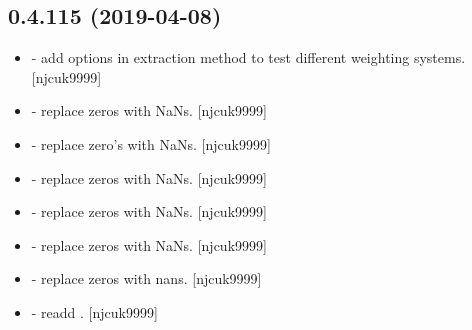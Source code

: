 \documentclass[a4paper,10pt,english]{report}
\begin{document}
\subsection{0.4.115 (2019-04-08)}
\label{\detokenize{misc/changelog:id145}}\begin{itemize}
\item {} 
 - add options in extraction method to test different
weighting systems. {[}njcuk9999{]}

\item {} 
 - replace zeros with NaNs. {[}njcuk9999{]}

\item {} 
 - replace zero’s with NaNs. {[}njcuk9999{]}

\item {} 
 - replace zeros with NaNs. {[}njcuk9999{]}

\item {} 
 - replace zeros with NaNs. {[}njcuk9999{]}

\item {} 
 - replace zeros with NaNs. {[}njcuk9999{]}

\item {} 
 - replace zeros with nans. {[}njcuk9999{]}

\item {} 
 - readd . {[}njcuk9999{]}

\end{itemize}
\end{document}
